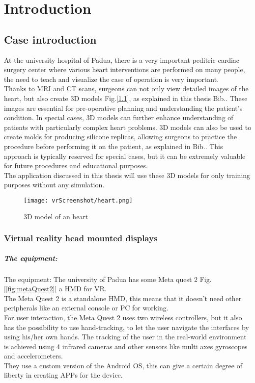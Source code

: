 
\chapter{Introduction}
\label{chp:intro}

\section{Case introduction}
\noindent
At the university hospital of Padua, 
there is a very important peditric cardiac surgery center where various heart interventions are performed on many people,
the need to teach and visualize the case of operation is very important. \\
Thanks to \ac{MRI} and \ac{CT} scans, surgeons can not only view detailed images of the heart, but also create 3D models Fig.[\ref{fig:heart}], as explained in this thesis Bib.\cite{thesisFrancesco}. These images are essential for pre-operative planning and understanding the patient's condition.
In special cases, 3D models can further enhance understanding of patients with particularly complex heart problems.
3D models can also be used to create molds for producing silicone replicas, allowing surgeons to practice the procedure before performing it on the patient, as explained in Bib.\cite{thesisFabio}.
This approach is typically reserved for special cases, but it can be extremely valuable for future procedures and educational purposes.\\
The application discussed in this thesis will use these 3D models for only training purposes without any simulation.\\

\begin{figure}[ht]
  \centering
  \texttt{[image: vrScreenshot/heart.png]}
  \caption{3D model of an heart}
  \label{fig:heart}
\end{figure}
\subsection{Virtual reality head mounted displays}

\paragraph{The equipment:}
The equipment: The university of Padua has some Meta quest 2 Fig.[\ref{fig:metaQuest2}] a \ac{HMD} for \ac{VR}.\\ 
The Meta Quest 2 is a standalone \ac{HMD}, this means that it doesn't need other peripherals like an external console or \ac{PC} for working.\\
For user interaction, the Meta Quest 2 uses two wireless controllers, but it also has the possibility to use hand-tracking, to let the user navigate the interfaces by using his/her own hands.
The tracking of the user in the real-world environment is achieved using 4 infrared cameras and other sensors like multi axes gyroscopes and accelerometers.\\
They use a custom version of the Android \ac{OS}, this can give a certain degree of liberty in creating APPs for the device.

